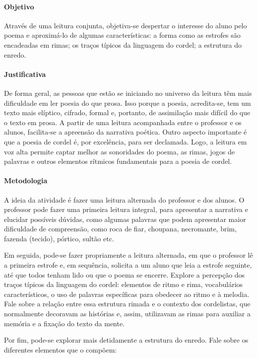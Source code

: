 \documentclass[11pt]{extarticle}
\begin{document}
\paragraph{Objetivo} Através de uma leitura conjunta, objetiva-se despertar o interesse do aluno pelo poema e aproximá-lo de algumas características: a forma como as estrofes são encadeadas em rimas; os traços típicos da linguagem do cordel; a estrutura do enredo.

\paragraph{Justificativa} De forma geral, as pessoas que estão se iniciando no universo da leitura têm mais dificuldade em ler poesia do que prosa. Isso porque a poesia, acredita-se, tem um texto mais elíptico, cifrado, formal e, portanto, de assimilação mais difícil do que o texto em prosa. A partir de uma leitura acompanhada entre o professor e os alunos, facilita-se a apreensão da narrativa poética. Outro aspecto importante é que a poesia de cordel é, por excelência, para ser declamada. Logo, a leitura em voz alta permite captar melhor as sonoridades do poema, as rimas, jogos de palavras e outros elementos rítmicos fundamentais para a poesia de cordel.

\paragraph{Metodologia} A ideia da atividade é fazer uma leitura alternada do professor e dos alunos. O professor pode fazer uma primeira leitura integral, para apresentar a narrativa e elucidar possíveis dúvidas, como algumas palavras que podem apresentar maior dificuldade de compreensão, como roca de fiar, choupana, necromante, brim, fazenda (tecido), pórtico, sultão etc. 

Em seguida, pode-se fazer propriamente a leitura alternada, em que o professor lê a primeira estrofe e, em sequência, solicita a um aluno que leia a estrofe seguinte, até que todos tenham lido ou que o poema se encerre.
Explore a percepção dos traços típicos da linguagem do cordel: elementos de ritmo e rima, vocabulários característicos, o uso de palavras específicas para obedecer ao ritmo e à melodia. Fale sobre a relação entre essa estrutura rimada e o contexto dos cordelistas, que normalmente decoravam as histórias e, assim, utilizavam as rimas para auxiliar a memória e a fixação do texto da mente.

Por fim, pode-se explorar mais detidamente a estrutura do enredo. Fale sobre os diferentes elementos que o compõem:
\end{document}

